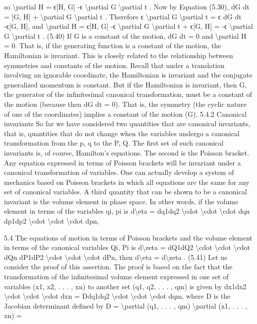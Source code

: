 so
\textbackslash{}partial H = ϵ[H, G] -ϵ \textbackslash{}partial G
\textbackslash{}partial t .
Now by Equation (5.30),
dG
dt = [G, H] + \textbackslash{}partial G
\textbackslash{}partial t .
Therefore
ϵ \textbackslash{}partial G
\textbackslash{}partial t = ϵ dG
dt -ϵ[G, H],
and
\textbackslash{}partial H = ϵ[H, G] -ϵ \textbackslash{}partial G
\textbackslash{}partial t + ϵ[G, H] = -ϵ \textbackslash{}partial G
\textbackslash{}partial t .
(5.40)
If G is a constant of the motion, dG
dt = 0 and \textbackslash{}partial H = 0. That is, if the generating function is a constant of the motion, the Hamiltonian is invariant. This
is closely related to the relationship between symmetries and constants of the
motion. Recall that under a translation involving an ignorable coordinate, the
Hamiltonian is invariant and the conjugate generalized momentum is constant.
But if the Hamiltonian is invariant, then G, the generator of the infinitesimal canonical transformation, must be a constant of the motion (because then
dG
dt = 0). That is, the symmetry (the cyclic nature of one of the coordinates)
implies a constant of the motion (G).
5.4.2 Canonical invariants
So far we have considered two quantities that are canonical invariants, that is,
quantities that do not change when the variables undergo a canonical transformation from the p, q to the P, Q. The first set of such canonical invariants is,
of course, Hamilton's equations. The second is the Poisson bracket. Any equation expressed in terms of Poisson brackets will be invariant under a canonical
transformation of variables. One can actually develop a system of mechanics
based on Poisson brackets in which all equations are the same for any set of
canonical variables.
A third quantity that can be shown to be a canonical invariant is the volume
element in phase space. In other words, if the volume element in terms of the
variables qi, pi is
d\textbackslash{}eta  = dq1dq2 \textbackslash{}cdot  \textbackslash{}cdot  \textbackslash{}cdot  dqn dp1dp2 \textbackslash{}cdot  \textbackslash{}cdot  \textbackslash{}cdot  dpn,

5.4
The equations of motion in terms of Poisson brackets
and the volume element in terms of the canonical variables Qi, Pi is
d\textbackslash{}zeta  = dQ1dQ2 \textbackslash{}cdot  \textbackslash{}cdot  \textbackslash{}cdot  dQn dP1dP2 \textbackslash{}cdot  \textbackslash{}cdot  \textbackslash{}cdot  dPn,
then
d\textbackslash{}eta  = d\textbackslash{}zeta .
(5.41)
Let us consider the proof of this assertion. The proof is based on the fact that
the transformation of the infinitesimal volume element expressed in one set of
variables (x1, x2, . . . , xn) to another set (q1, q2, . . . , qm) is given by
dx1dx2 \textbackslash{}cdot  \textbackslash{}cdot  \textbackslash{}cdot  dxn = Ddq1dq2 \textbackslash{}cdot  \textbackslash{}cdot  \textbackslash{}cdot  dqm,
where D is the Jacobian determinant defined by
D = \textbackslash{}partial (q1, . . . , qm)
\textbackslash{}partial (x1, . . . , xn) =

